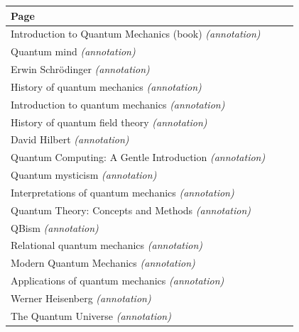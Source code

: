\documentclass[11pt,oneside]{book}
\begin{document}
\begin{longtable}{p{0.92\linewidth}}
\toprule
Page \\
\midrule
\endhead
{}\label{page:introduction-to-quantum-mechanics-book}Introduction to Quantum Mechanics (book) \emph{(annotation)} \\
\label{page:quantum-mind}Quantum mind \emph{(annotation)} \\
\label{page:erwin-schr-dinger}Erwin Schrödinger \emph{(annotation)} \\
\label{page:history-of-quantum-mechanics}History of quantum mechanics \emph{(annotation)} \\
\label{page:introduction-to-quantum-mechanics}Introduction to quantum mechanics \emph{(annotation)} \\
\label{page:history-of-quantum-field-theory}History of quantum field theory \emph{(annotation)} \\
\label{page:david-hilbert}David Hilbert \emph{(annotation)} \\
\label{page:quantum-computing-a-gentle-introduction}Quantum Computing: A Gentle Introduction \emph{(annotation)} \\
\label{page:quantum-mysticism}Quantum mysticism \emph{(annotation)} \\
\label{page:interpretations-of-quantum-mechanics}Interpretations of quantum mechanics \emph{(annotation)} \\
\label{page:quantum-theory-concepts-and-methods}Quantum Theory: Concepts and Methods \emph{(annotation)} \\
\label{page:qbism}QBism \emph{(annotation)} \\
\label{page:relational-quantum-mechanics}Relational quantum mechanics \emph{(annotation)} \\
\label{page:modern-quantum-mechanics}Modern Quantum Mechanics \emph{(annotation)} \\
\label{page:applications-of-quantum-mechanics}Applications of quantum mechanics \emph{(annotation)} \\
\label{page:werner-heisenberg}Werner Heisenberg \emph{(annotation)} \\
\label{page:the-quantum-universe}The Quantum Universe \emph{(annotation)} \\
\bottomrule
\end{longtable}
\end{document}

